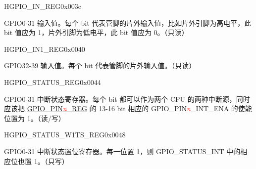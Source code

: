 \begin{register}{H}{GPIO\_IN\_REG}{0x003c}\label{regdesc:GPIOINREG}
%
\regnewline%
\begin{regdesc}\begin{reglist}
\item [GPIO\_IN\_REG]GPIO0-31 输入值。每个 bit 代表管脚的片外输入值，比如片外引脚为高电平，此 bit 值应为 1，片外引脚为低电平，此 bit 值应为 0。（只读）
\end{reglist}\end{regdesc}
\end{register}


\begin{register}{H}{GPIO\_IN1\_REG}{0x0040}\label{regdesc:GPIOIN1REG}
%
%
\regnewline%
\begin{regdesc}\begin{reglist}
\item [GPIO\_IN\_DATA\_NEXT]GPIO32-39 输入值。每个 bit 代表管脚的片外输入值。（只读）
\end{reglist}\end{regdesc}
\end{register}


\begin{register}{H}{GPIO\_STATUS\_REG}{0x0044}\label{regdesc:GPIOSTATUSREG}
%
\regnewline%
\begin{regdesc}\begin{reglist}
\item [GPIO\_STATUS\_INT]GPIO0-31 中断状态寄存器。每个 bit 都可以作为两个 CPU 的两种中断源，同时应该把 \hyperref[regdesc:GPIOPINnREG]{GPIO\_PIN\textcolor{red}{\it{n}}\_REG} 的 13-16 bit 相应的 GPIO\_PIN\textcolor{red}{\it{n}}\_INT\_ENA 的使能位置为 1。（读/写）
\end{reglist}\end{regdesc}
\end{register}


\begin{register}{H}{GPIO\_STATUS\_W1TS\_REG}{0x0048}\label{regdesc:GPIOSTATUSW1TSREG}
%
\regnewline%
\begin{regdesc}\begin{reglist}
\item [GPIO\_STATUS\_INT\_W1TS]GPIO0-31 中断状态置位寄存器。每一位置 1，则 GPIO\_STATUS\_INT 中的相应位也置 1。（只写）
\end{reglist}\end{regdesc}
\end{register}


